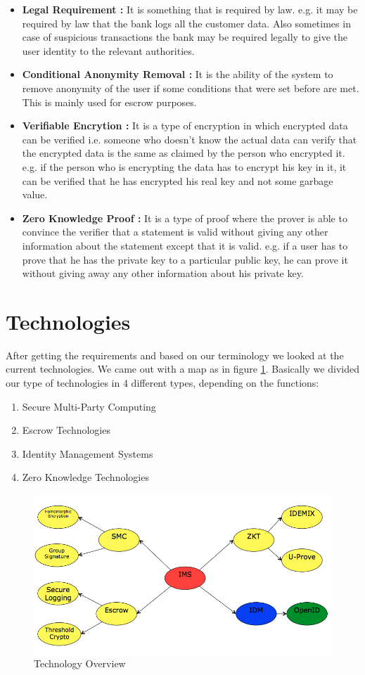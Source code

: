 \begin{itemize}
\item\textbf{Legal Requirement :}
It is something that is required by law. e.g. it may be required by law that the bank logs all the customer data. Also sometimes in case of suspicious transactions the bank may be required legally to give the user identity to the relevant authorities.
\item\textbf{Conditional Anonymity Removal :}
It is the ability of the system to remove anonymity of the user if some conditions that were set before are met. This is mainly used for escrow purposes.
\item\textbf{Verifiable Encrytion{\cite{VE}} :}
It is a type of encryption in which encrypted data can be verified i.e. someone who doesn't know the actual data can verify that the encrypted data is the same as claimed by the person who encrypted it. e.g. if the person who is encrypting the data has to encrypt his key in it, it can be verified that he has encrypted his real key and not some garbage value.
\item\textbf{Zero Knowledge Proof\cite{ZK}\cite{feige1988zero} :}
It is a type of proof where the prover is able to convince the verifier that a statement is valid without giving any other information about the statement except that it is valid. e.g. if a user has to prove that he has the private key to a particular public key, he can prove it without giving away any other information about his private key.
\end{itemize}
\section{Technologies}
After getting the requirements and based on our terminology we looked at the current technologies. We came out with a map as in figure \ref{fig:Technologies}. Basically we divided our type of technologies in 4 different types, depending on the functions:
\begin{enumerate}
	\item Secure Multi-Party Computing
	\item Escrow Technologies
	\item Identity Management Systems
	\item Zero Knowledge Technologies
\end{enumerate}
\begin{figure}[h]
	\centering
	\includegraphics[width=\textwidth]{figures/Technologies}
	\caption{Technology Overview}
	\label{fig:Technologies}
\end{figure}
